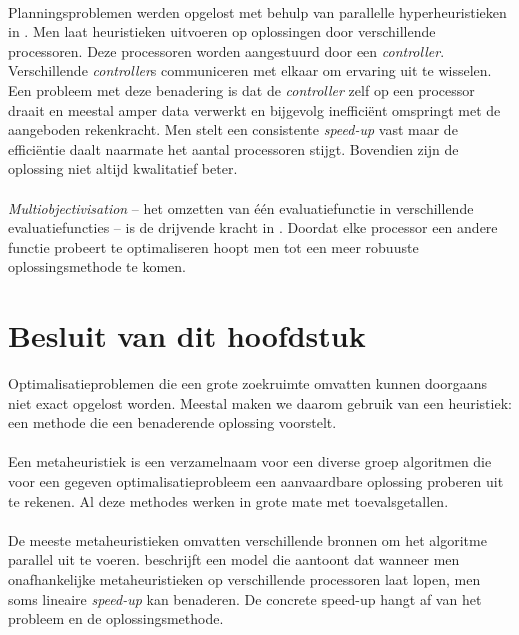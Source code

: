 \paragraph{}
Planningsproblemen werden opgelost met behulp van parallelle hyperheuristieken in \cite{Rattadilok04adistributed}. Men laat heuristieken uitvoeren op oplossingen door verschillende processoren. Deze processoren worden aangestuurd door een \emph{controller}. Verschillende \emph{controller}s communiceren met elkaar om ervaring uit te wisselen. Een probleem met deze benadering is dat de \emph{controller} zelf op een processor draait en meestal amper data verwerkt en bijgevolg ineffici\"ent omspringt met de aangeboden rekenkracht. Men stelt een consistente \emph{speed-up} vast maar de effici\"entie daalt naarmate het aantal processoren stijgt. Bovendien zijn de oplossing niet altijd kwalitatief beter.

\paragraph{}
\emph{Multiobjectivisation} -- het omzetten van \'e\'en evaluatiefunctie in verschillende evaluatiefuncties -- is de drijvende kracht in \cite{Luna08usinga}. Doordat elke processor een andere functie probeert te optimaliseren hoopt men tot een meer robuuste oplossingsmethode te komen.


\section{Besluit van dit hoofdstuk}
Optimalisatieproblemen die een grote zoekruimte omvatten kunnen doorgaans niet exact opgelost worden. Meestal maken we daarom gebruik van een heuristiek: een methode die een benaderende oplossing voorstelt.

\paragraph{}
Een metaheuristiek is een verzamelnaam voor een diverse groep algoritmen die voor een gegeven optimalisatieprobleem een aanvaardbare oplossing proberen uit te rekenen. Al deze methodes werken in grote mate met toevalsgetallen.

\paragraph{}
De meeste metaheuristieken omvatten verschillende bronnen om het algoritme parallel uit te voeren. \cite{DBLP:journals/jc/ShonkwilerV94} beschrijft een model die aantoont dat wanneer men onafhankelijke metaheuristieken op verschillende processoren laat lopen, men soms lineaire \emph{speed-up} kan benaderen. De concrete speed-up hangt af van het probleem en de oplossingsmethode.

